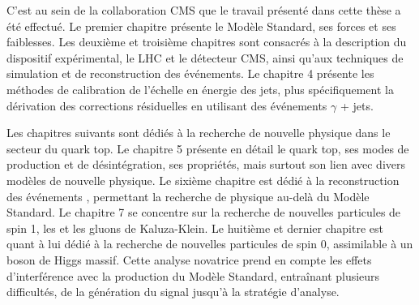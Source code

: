 \bigskip

C'est au sein de la collaboration CMS que le travail présenté dans cette thèse a été effectué. Le premier chapitre présente le Modèle Standard, ses forces et ses faiblesses. Les deuxième et troisième chapitres sont consacrés à la description du dispositif expérimental, le LHC et le détecteur CMS, ainsi qu'aux techniques de simulation et de reconstruction des événements. Le chapitre 4 présente les méthodes de calibration de l'échelle en énergie des jets, plus spécifiquement la dérivation des corrections résiduelles en utilisant des événements $\gamma$ + jets.

\medskip

Les chapitres suivants sont dédiés à la recherche de nouvelle physique dans le secteur du quark top. Le chapitre 5 présente en détail le quark top, ses modes de production et de désintégration, ses propriétés, mais surtout son lien avec divers modèles de nouvelle physique. Le sixième chapitre est dédié à la reconstruction des événements \ttbar, permettant la recherche de physique au-delà du Modèle Standard. Le chapitre 7 se concentre sur la recherche de nouvelles particules de spin 1, les \zprime et les gluons de Kaluza-Klein. Le huitième et dernier chapitre est quant à lui dédié à la recherche de nouvelles particules de spin 0, assimilable à un boson de Higgs massif. Cette analyse novatrice prend en compte les effets d'interférence avec la production du Modèle Standard, entraînant plusieurs difficultés, de la génération du signal jusqu'à la stratégie d'analyse.